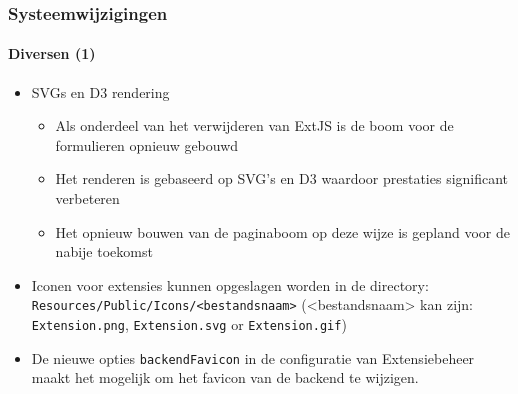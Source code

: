 %
%

\begin{frame}[fragile]
	\frametitle{Systeemwijzigingen}
	\framesubtitle{Diversen (1)}

	\begin{itemize}

		\item SVGs en D3 rendering

			\begin{itemize}
				\item Als onderdeel van het verwijderen van ExtJS is de boom voor de formulieren opnieuw gebouwd
				\item Het renderen is gebaseerd op SVG's en D3 waardoor prestaties significant verbeteren
				\item Het opnieuw bouwen van de paginaboom op deze wijze is gepland voor de nabije toekomst
			\end{itemize}

		\item Iconen voor extensies kunnen opgeslagen worden in de directory:\newline
			\small
				\texttt{Resources/Public/Icons/<bestandsnaam>}
				(<bestandsnaam> kan zijn: \texttt{Extension.png}, \texttt{Extension.svg} or \texttt{Extension.gif})
			\normalsize

		\item De nieuwe opties \texttt{backendFavicon} in de configuratie van Extensiebeheer maakt het mogelijk om het favicon
			van de backend te wijzigen.

	\end{itemize}

\end{frame}

